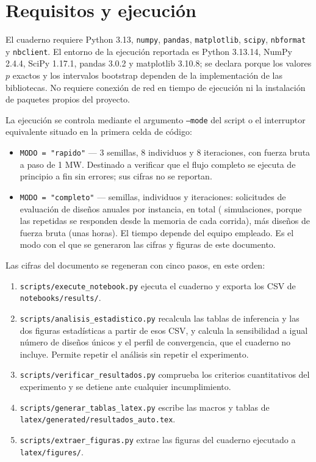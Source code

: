\section{Requisitos y ejecución}

El cuaderno requiere Python 3.13, \texttt{numpy}, \texttt{pandas}, \texttt{matplotlib}, \texttt{scipy}, \texttt{nbformat} y \texttt{nbclient}. El entorno de la ejecución reportada es Python 3.13.14, NumPy 2.4.4, SciPy 1.17.1, pandas 3.0.2 y matplotlib 3.10.8; se declara porque los valores $p$ exactos y los intervalos bootstrap dependen de la implementación de las bibliotecas. No requiere conexión de red en tiempo de ejecución ni la instalación de paquetes propios del proyecto.

La ejecución se controla mediante el argumento \texttt{--mode} del script o el interruptor equivalente situado en la primera celda de código:

\begin{itemize}
    \item \texttt{MODO = "rapido"} --- 3 semillas, 8 individuos y 8 iteraciones, con fuerza bruta a paso de 1 MW. Destinado a verificar que el flujo completo se ejecuta de principio a fin sin errores; sus cifras no se reportan.
    \item \texttt{MODO = "completo"} --- \Replicates{} semillas, \Population{} individuos y \Iterations{} iteraciones: \RequestsPerInstance{} solicitudes de evaluación de diseños anuales por instancia, \TotalDesignRequests{} en total (\SimulationsTotal{} simulaciones, porque las repetidas se responden desde la memoria de cada corrida), más \BruteForceDesignsTotal{} diseños de fuerza bruta (unas \BruteForceElapsedHours{} horas). El tiempo depende del equipo empleado. Es el modo con el que se generaron las cifras y figuras de este documento.
\end{itemize}

Las cifras del documento se regeneran con cinco pasos, en este orden:

\begin{enumerate}
    \item \texttt{scripts/execute\_notebook.py} ejecuta el cuaderno y exporta los CSV de \texttt{notebooks/results/}.
    \item \texttt{scripts/analisis\_estadistico.py} recalcula las tablas de inferencia y las dos figuras estadísticas a partir de esos CSV, y calcula la sensibilidad a igual número de diseños únicos y el perfil de convergencia, que el cuaderno no incluye. Permite repetir el análisis sin repetir el experimento.
    \item \texttt{scripts/verificar\_resultados.py} comprueba los criterios cuantitativos del experimento y se detiene ante cualquier incumplimiento.
    \item \texttt{scripts/generar\_tablas\_latex.py} escribe las macros y tablas de \texttt{latex/generated/resultados\_auto.tex}.
    \item \texttt{scripts/extraer\_figuras.py} extrae las figuras del cuaderno ejecutado a \texttt{latex/figures/}.
\end{enumerate}

